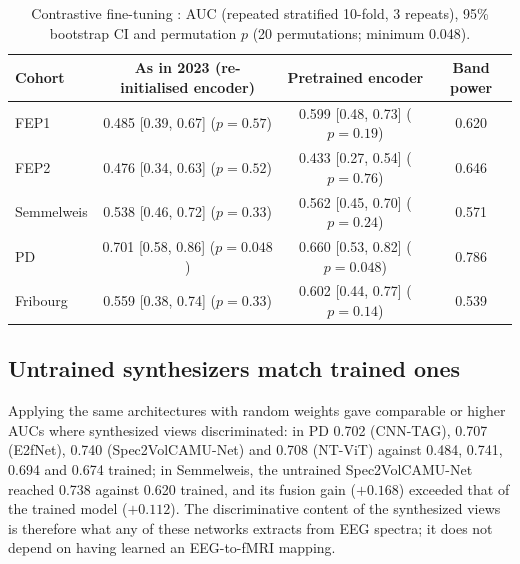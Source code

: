 \documentclass[11pt]{article}
\begin{document}
\begin{table}[t]
\centering
\caption{Contrastive fine-tuning \citep{calhas2023medrxiv}: AUC (repeated stratified 10-fold, 3 repeats), 95\% bootstrap CI and permutation $p$ (20 permutations; minimum 0.048).}
\label{tab:contrastive}
\small
\begin{tabular}{lccc}
\toprule
Cohort & As in 2023 (re-initialised encoder) & Pretrained encoder & Band power \\
\midrule
FEP1 & 0.485 [0.39, 0.67] ($p=0.57$) & 0.599 [0.48, 0.73] ($p=0.19$) & 0.620 \\
FEP2 & 0.476 [0.34, 0.63] ($p=0.52$) & 0.433 [0.27, 0.54] ($p=0.76$) & 0.646 \\
Semmelweis & 0.538 [0.46, 0.72] ($p=0.33$) & 0.562 [0.45, 0.70] ($p=0.24$) & 0.571 \\
PD & 0.701 [0.58, 0.86] ($p=0.048$) & 0.660 [0.53, 0.82] ($p=0.048$) & 0.786 \\
Fribourg & 0.559 [0.38, 0.74] ($p=0.33$) & 0.602 [0.44, 0.77] ($p=0.14$) & 0.539 \\
\bottomrule
\end{tabular}
\end{table}

\subsection{Untrained synthesizers match trained ones}\label{sec:res_untrained}
Applying the same architectures with random weights gave comparable or higher AUCs where synthesized views discriminated: in PD 0.702 (CNN-TAG), 0.707 (E2fNet), 0.740 (Spec2VolCAMU-Net) and 0.708 (NT-ViT) against 0.484, 0.741, 0.694 and 0.674 trained; in Semmelweis, the untrained Spec2VolCAMU-Net reached 0.738 against 0.620 trained, and its fusion gain ($+0.168$) exceeded that of the trained model ($+0.112$).
The discriminative content of the synthesized views is therefore what any of these networks extracts from EEG spectra; it does not depend on having learned an EEG-to-fMRI mapping.
\end{document}
